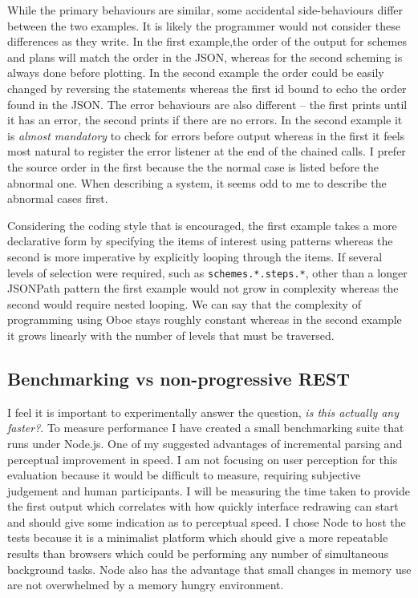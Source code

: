 \documentclass[]{article}
\begin{document}
While the primary behaviours are similar, some accidental
side-behaviours differ between the two examples. It is likely the
programmer would not consider these differences as they write. In the
first example,the order of the output for schemes and plans will match
the order in the JSON, whereas for the second scheming is always done
before plotting. In the second example the order could be easily changed
by reversing the statements whereas the first id bound to echo the order
found in the JSON. The error behaviours are also different -- the first
prints until it has an error, the second prints if there are no errors.
In the second example it is \emph{almost mandatory} to check for errors
before output whereas in the first it feels most natural to register the
error listener at the end of the chained calls. I prefer the source
order in the first because the the normal case is listed before the
abnormal one. When describing a system, it seems odd to me to describe
the abnormal cases first.

Considering the coding style that is encouraged, the first example takes
a more declarative form by specifying the items of interest using
patterns whereas the second is more imperative by explicitly looping
through the items. If several levels of selection were required, such as
\texttt{schemes.*.steps.*}, other than a longer JSONPath pattern the
first example would not grow in complexity whereas the second would
require nested looping. We can say that the complexity of programming
using Oboe stays roughly constant whereas in the second example it grows
linearly with the number of levels that must be traversed.

\subsection{Benchmarking vs non-progressive REST}

I feel it is important to experimentally answer the question, \emph{is
this actually any faster?}. To measure performance I have created a
small benchmarking suite that runs under Node.js. One of my suggested
advantages of incremental parsing and perceptual improvement in speed. I
am not focusing on user perception for this evaluation because it would
be difficult to measure, requiring subjective judgement and human
participants. I will be measuring the time taken to provide the first
output which correlates with how quickly interface redrawing can start
and should give some indication as to perceptual speed. I chose Node to
host the tests because it is a minimalist platform which should give a
more repeatable results than browsers which could be performing any
number of simultaneous background tasks. Node also has the advantage
that small changes in memory use are not overwhelmed by a memory hungry
environment.
\end{document}
